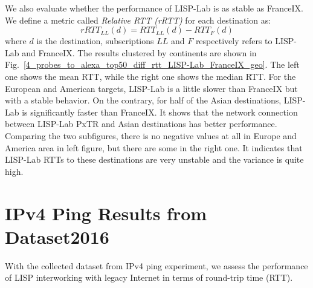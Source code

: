 We also evaluate whether the performance of LISP-Lab is as stable as FranceIX. %
We define a metric called \emph{Relative RTT (rRTT)} for each destination as: 
\begin{equation} 
    \label{rRTT_ll_2015}
    rRTT_{LL}(d)=RTT_{LL}(d) - RTT_{F}(d)
\end{equation}
where $d$ is the destination, subscriptions $LL$ and $F$ respectively refers to LISP-Lab and FranceIX. The results clustered by continents are shown in Fig.~\ref{4_probes_to_alexa_top50_diff_rtt_LISP-Lab_FranceIX_geo}. The left one shows the mean RTT, while the right one shows the median RTT. For the European and American targets, LISP-Lab is a little slower than FranceIX but with a stable behavior. On the contrary, for half of the Asian destinations, LISP-Lab is significantly faster than FranceIX. It shows that the network connection between LISP-Lab PxTR and Asian destinations has better performance. Comparing the two subfigures, there is no negative values at all in Europe and America area in left figure, but there are some in the right one. It indicates that LISP-Lab RTTs to these destinations are very unstable and the variance is quite high.


\section{IPv4 Ping Results from Dataset2016}
\label{sec:pxtr_ping_v4_2016}

With the collected dataset from IPv4 ping experiment, we assess the performance of LISP interworking with legacy Internet in terms of round-trip time (RTT).

